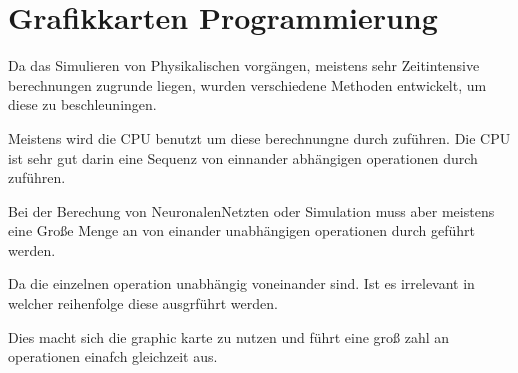 
\section{Grafikkarten Programmierung} \label{sec:gpu}

Da das Simulieren von Physikalischen vorgängen, meistens sehr Zeitintensive berechnungen zugrunde liegen, wurden verschiedene Methoden entwickelt, um diese zu beschleuningen.

Meistens wird die CPU benutzt um diese berechnungne durch zuführen.
Die CPU ist sehr gut darin eine Sequenz von einnander abhängigen operationen durch zuführen.

Bei der Berechung von NeuronalenNetzten oder Simulation muss aber meistens eine Große Menge 
an von einander unabhängigen operationen durch geführt werden.

Da die einzelnen operation unabhängig voneinander sind.
Ist es irrelevant in welcher reihenfolge diese ausgrführt werden.

Dies macht sich die graphic karte zu nutzen und führt eine groß zahl an operationen einafch gleichzeit aus.






% 